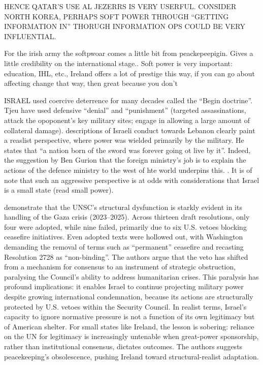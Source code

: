 HENCE QATAR’S USE AL JEZERRS IS VERY USERFUL. CONSIDER NORTH KOREA, PERHAPS SOFT POWER THROUGH “GETTING INFORMATION IN” THORUGH INFORMATION OPS COULD BE VERY INFLUENTIAL. 

For the irish army the softpwoar comes a little bit from peackepeepigin. Gives a little credibility on the international stage.. Soft power is very important: education, IHL, etc., Ireland offers a lot of prestige this way, if you can go about affecting change that way, then great because you don’t 


ISRAEL used coercive deterrence for many decades called the “Begin doctrine”. Tjeu have used defensive “denial” and “punishment” (targeted assassinations, attack the opoponent’s key military sites; engage in allowing a large amount of collateral damage). \parencite{HIRST_2010} descriptions of Israeli conduct towards Lebanon clearly paint a reaslist perspective, where power was wielded primarily by the military. He states that ``a nation born of the sword was forever going ot live by it''. Indeed, the suggestion by Ben Gurion that the foreign ministry's job is to explain the actions of the defence ministry to the west of hte world underpins this. \parencite[p. 53]{HIRST_2010}. It is of note that such an aggressive perspective is at odds with considerations that Israel is a small state (read small power).

\textcite{DUMAN_2025} demonstrate that the UNSC’s structural dysfunction is starkly evident in its handling of the Gaza crisis (2023–2025).  Across thirteen draft resolutions, only four were adopted, while nine failed, primarily due to six U.S. vetoes blocking ceasefire initiatives.  Even adopted texts were hollowed out, with Washington demanding the removal of terms such as ``permanent'' ceasefire and recasting Resolution 2728 as ``non-binding''.  The authors argue that the veto has shifted from a mechanism for consensus to an instrument of strategic obstruction, paralysing the Council’s ability to address humanitarian crises.  This paralysis has profound implications: it enables Israel to continue projecting military power despite growing international condemnation, because its actions are structurally protected by U.S. vetoes within the Security Council.  In realist terms, Israel’s capacity to ignore normative pressure is not a function of its own legitimacy but of American shelter.  For small states like Ireland, the lesson is sobering: reliance on the UN for legitimacy is increasingly untenable when great-power sponsorship, rather than institutional consensus, dictates outcomes. \textcite{DUMAN_2025} The authors suggests peacekeeping’s obsolescence, pushing Ireland toward structural-realist adaptation.


